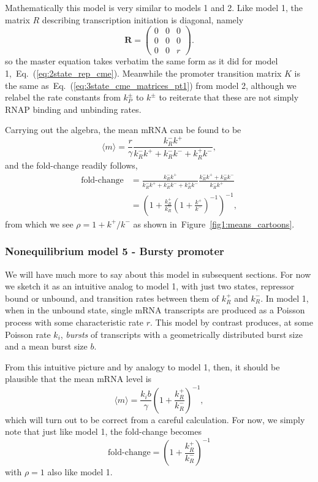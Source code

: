 \documentclass[12pt]{article}%
\newcommand{\matr}[1]{\mathbf{#1}}
\newcommand{\fig}[1]{Figure~\ref{#1}}
\newcommand{\eq}[1]{Eq.~(\ref{#1})}
\begin{document}
Mathematically this model is very similar to models 1 and 2.
Like model 1, the matrix $R$ describing transcription initiation
is diagonal, namely
\begin{equation}
\matr{R} = \begin{pmatrix}
                0 & 0 & 0 \\ 0 & 0 & 0 \\ 0 & 0 & r
        \end{pmatrix}.
\end{equation}
so the master equation takes verbatim the same form as it did for model
1,~\eq{eq:2state_rep_cme}. Meanwhile the promoter transition matrix
$K$ is the same as~\eq{eq:3state_cme_matrices_pt1} from model 2,
although we relabel the rate constants from $k_P^\pm$ to $k^\pm$ to
reiterate that these are not simply RNAP binding and unbinding rates.

Carrying out the algebra, the mean mRNA can be found to be
\begin{equation}
\langle m\rangle = \frac{r}{\gamma}
\frac{k_R^- k^+}
{k_R^- k^+ + k_R^- k^- + k_R^+ k^-},
\end{equation}
and the fold-change readily follows,
\begin{align}
\text{fold-change}
&=      \frac{k_R^- k^+}{k_R^- k^+ + k_R^- k^- + k_R^+ k^-}
        \frac{k_R^- k^+ + k_R^- k^-}{k_R^- k^+}
\\
&=      \left(1 + \frac{k_R^+}{k_R^-}
                \left(1 + \frac{k^+}{k^-}\right)^{-1}
        \right)^{-1},
\end{align}
from which we see $\rho = 1 + k^+/k^-$ as shown in~\fig{fig1:means_cartoons}.

\subsubsection{Nonequilibrium model 5 - Bursty promoter}
We will have much more to say about this model in subsequent sections.
For now we sketch it as an intuitive analog to model 1,
with just two states, repressor bound or unbound, and transition rates
between them of $k_R^+$ and $k_R^-$.
In model 1, when in the unbound state, single mRNA transcripts
are produced as a Poisson process with some characteristic rate
$r$. This model by contrast produces, at some Poisson rate $k_i$,
\textit{bursts} of transcripts with a geometrically distributed
burst size and a mean burst size $b$.

From this intuitive picture and by analogy to model 1, then, it should be plausible that the mean mRNA level is
\begin{equation}
\langle m\rangle = \frac{k_i b}{\gamma}
        \left(1 + \frac{k_R^+}{k_R^-}\right)^{-1},
\end{equation}
which will turn out to be correct from a careful calculation.
For now, we simply note that just like model 1, the fold-change becomes
\begin{equation}
\text{fold-change} = \left(1 + \frac{k_R^+}{k_R^-}\right)^{-1}
\end{equation}
with $\rho=1$ also like model 1.
\end{document}
